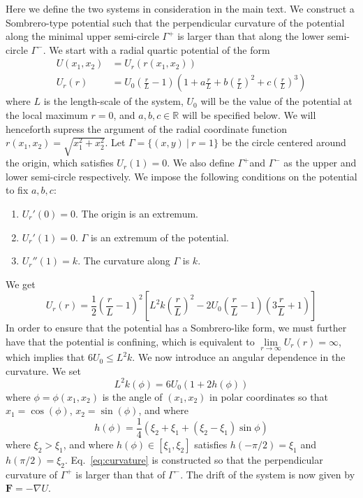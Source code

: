 Here we define the two systems in consideration in the main text.
We construct a Sombrero-type potential such that the perpendicular
curvature of the potential along the minimal upper semi-circle $\Gamma^{+}$
is larger than that along the lower semi-circle $\Gamma^{-}$. We
start with a radial quartic potential of the form 
\begin{align}
U(x_{1},x_{2}) & =U_{r}(r(x_{1},x_{2}))\\
U_{r}(r) & =U_{0}\left(\frac{r}{L}-1\right)\left(1+a\frac{r}{L}+b\left(\frac{r}{L}\right)^{2}+c\left(\frac{r}{L}\right)^{3}\right)\nonumber 
\end{align}
where $L$ is the length-scale of the system, $U_{0}$ will be the
value of the potential at the local maximum $r=0$, and $a,b,c\in\mathbb{R}$
will be specified below. We will henceforth supress the argument of
the radial coordinate function $r(x_{1},x_{2})=\sqrt{x_{1}^{2}+x_{2}^{2}}$.
Let $\Gamma=\{(x,y)\ |\ r=1\}$ be the circle centered around the
origin, which satisfies $U_{r}(1)=0$. We also define $\Gamma^{+}$and
$\Gamma^{-}$ as the upper and lower semi-circle respectively. We
impose the following conditions on the potential to fix $a,b,c$:
\begin{enumerate}
\item $U_r'(0) = 0$. The origin is an extremum.
\item $U_r'(1) = 0$. $\Gamma$ is an extremum of the potential. \item $U_r''(1) = k$. The curvature along $\Gamma$ is $k$.
\end{enumerate}We get
\begin{equation}
U_{r}(r)=\frac{1}{2}\left(\frac{r}{L}-1\right)^{2}\left[L^{2}k\left(\frac{r}{L}\right)^{2}-2U_{0}\left(\frac{r}{L}-1\right)\left(3\frac{r}{L}+1\right)\right]
\end{equation}
In order to ensure that the potential has a Sombrero-like form, we
must further have that the potential is confining, which is equivalent
to $\underset{r\to\infty}{\lim}U_{r}(r)=\infty$, which implies that
$6U_{0}\leq L^{2}k$. We now introduce an angular dependence in the
curvature. We set
\begin{equation}
L^{2}k(\phi)=6U_{0}(1+2h(\phi))\label{eq:curvature}
\end{equation}
where $\phi=\phi(x_{1},x_{2})$ is the angle of $(x_{1},x_{2})$ in
polar coordinates so that $x_{1}=\cos(\phi)$, $x_{2}=\sin(\phi)$,
and where
\begin{equation}
h(\phi)=\frac{1}{4}\left(\xi_{2}+\xi_{1}+(\xi_{2}-\xi_{1})\sin\phi\right)
\end{equation}
where $\xi_{2}>\xi_{1}$, and where $h(\phi)\in[\xi_{1},\xi_{2}]$
satisfies $h(-\pi/2)=\xi_{1}$ and $h(\pi/2)=\xi_{2}$. Eq.~\eqref{eq:curvature}
is constructed so that the perpendicular curvature of $\Gamma^{+}$
is larger than that of $\Gamma^{-}$. The drift of the system is now
given by $\mathbf{F}=-\nabla U$.

